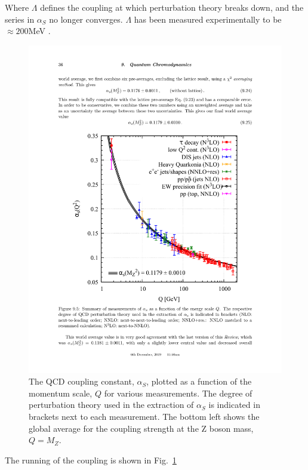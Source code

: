   Where $\Lambda$ defines the coupling at which perturbation theory breaks down, and the series in  $\alpha_S$ no longer converges. $\Lambda$ has been measured experimentally to be  $\approx 200$MeV \cite{Bettini2008}.

  \begin{figure}[htpb]
    \centering
    \includegraphics[trim={3.5cm 5.9cm 3cm 7cm},clip,width=1.0\textwidth] {Introduction/a_S_running.pdf}
    \caption{The QCD coupling constant, $\alpha_S$, plotted as a function of the momentum scale,  $Q$ for various measurements. The degree of perturbation theory used in the extraction of  $\alpha_S$ is indicated in brackets next to each measurement. The bottom left shows the global average for the coupling strength at the Z boson mass, $Q=M_Z$.}
    \label{fig:a_S_running}
  \end{figure}
  
  The running of the coupling is shown in Fig.~\ref{fig:a_S_running}


